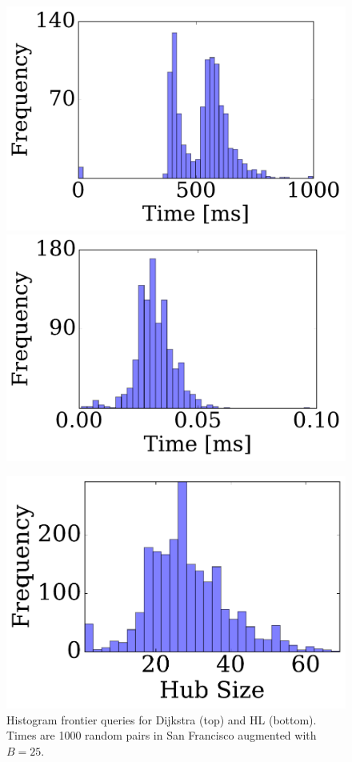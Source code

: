\begin{figure}
\begin{minipage}[t]{.47\textwidth}
\centering
\includegraphics[clip, trim=0.2cm 0.3cm 0.2cm 0.2cm,scale=0.3]{TexImg/SF_query_dij_B25.pdf}
\includegraphics[clip, trim=0.2cm 0.3cm 0.2cm 0.2cm,scale=0.3]{TexImg/SF_query_hl_B25.pdf}
\caption{Histogram frontier queries for Dijkstra (top) and HL (bottom). Times are 1000 random pairs in San Francisco augmented with $B=25$. }
\label{fig:SF_query}
\end{minipage}
\hfill
\begin{minipage}[t]{.47\textwidth}
\centering
\includegraphics[clip, trim = 0.1cm 0.3cm 0cm 0cm,scale=0.3]{TexImg/SF_bwd_hub_size.pdf}

\end{minipage}
\end{figure}
